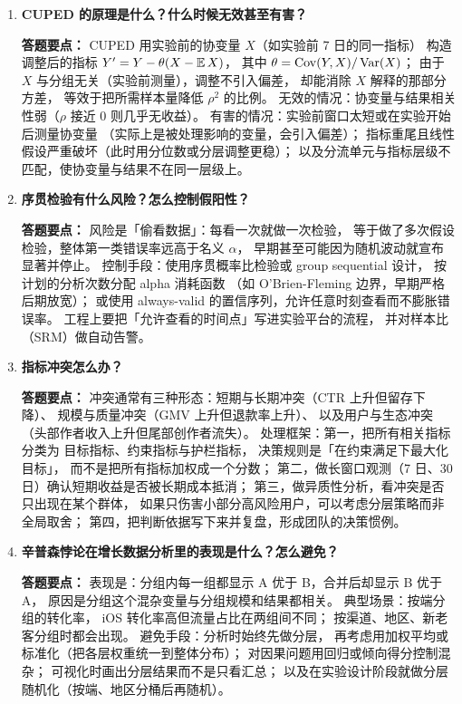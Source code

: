 \begin{interview}[题库与答题要点]
\begin{enumerate}[label=]
  \item[\textcolor{VioletDeep}{\textbf{Q122.}}] \textbf{CUPED 的原理是什么？什么时候无效甚至有害？}
\par\smallskip\noindent\textcolor{VioletDeep}{\textbf{答题要点：}}
CUPED 用实验前的协变量 $X$（如实验前 7 日的同一指标）
构造调整后的指标 $Y' = Y - \theta(X - \operatorname{\mathbb{E}} X)$，
其中 $\theta = \operatorname{Cov}(Y,X)/\operatorname{Var}(X)$；
由于 $X$ 与分组无关（实验前测量），调整不引入偏差，
却能消除 $X$ 解释的那部分方差，
等效于把所需样本量降低 $\rho^2$ 的比例。
无效的情况：协变量与结果相关性弱（$\rho$ 接近 0 则几乎无收益）。
有害的情况：实验前窗口太短或在实验开始后测量协变量
（实际上是被处理影响的变量，会引入偏差）；
指标重尾且线性假设严重破坏（此时用分位数或分层调整更稳）；
以及分流单元与指标层级不匹配，使协变量与结果不在同一层级上。

  \item[\textcolor{VioletDeep}{\textbf{Q123.}}] \textbf{序贯检验有什么风险？怎么控制假阳性？}
\par\smallskip\noindent\textcolor{VioletDeep}{\textbf{答题要点：}}
风险是「偷看数据」：每看一次就做一次检验，
等于做了多次假设检验，整体第一类错误率远高于名义 $\alpha$，
早期甚至可能因为随机波动就宣布显著并停止。
控制手段：使用序贯概率比检验或 group sequential 设计，
按计划的分析次数分配 alpha 消耗函数
（如 O'Brien-Fleming 边界，早期严格后期放宽）；
或使用 always-valid 的置信序列，允许任意时刻查看而不膨胀错误率。
工程上要把「允许查看的时间点」写进实验平台的流程，
并对样本比（SRM）做自动告警。

  \item[\textcolor{VioletDeep}{\textbf{Q124.}}] \textbf{指标冲突怎么办？}
\par\smallskip\noindent\textcolor{VioletDeep}{\textbf{答题要点：}}
冲突通常有三种形态：短期与长期冲突（CTR 上升但留存下降）、
规模与质量冲突（GMV 上升但退款率上升）、
以及用户与生态冲突（头部作者收入上升但尾部创作者流失）。
处理框架：第一，把所有相关指标分类为
目标指标、约束指标与护栏指标，
决策规则是「在约束满足下最大化目标」，
而不是把所有指标加权成一个分数；
第二，做长窗口观测（7 日、30 日）确认短期收益是否被长期成本抵消；
第三，做异质性分析，看冲突是否只出现在某个群体，
如果只伤害小部分高风险用户，可以考虑分层策略而非全局取舍；
第四，把判断依据写下来并复盘，形成团队的决策惯例。

  \item[\textcolor{VioletDeep}{\textbf{Q125.}}] \textbf{辛普森悖论在增长数据分析里的表现是什么？怎么避免？}
\par\smallskip\noindent\textcolor{VioletDeep}{\textbf{答题要点：}}
表现是：分组内每一组都显示 A 优于 B，合并后却显示 B 优于 A，
原因是分组这个混杂变量与分组规模和结果都相关。
典型场景：按端分组的转化率，
iOS 转化率高但流量占比在两组间不同；
按渠道、地区、新老客分组时都会出现。
避免手段：分析时始终先做分层，
再考虑用加权平均或标准化（把各层权重统一到整体分布）；
对因果问题用回归或倾向得分控制混杂；
可视化时画出分层结果而不是只看汇总；
以及在实验设计阶段就做分层随机化（按端、地区分桶后再随机）。


\end{enumerate}
\end{interview}
